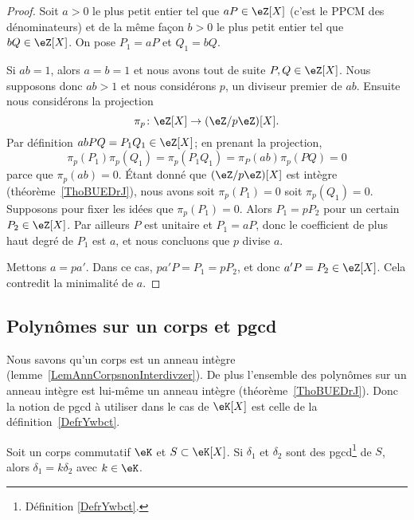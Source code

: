 \begin{proof}
	Soit \( a>0\) le plus petit entier tel que \( aP\in\eZ[X]\) (c'est le PPCM des dénominateurs) et de la même façon \( b>0\) le plus petit entier tel que \( bQ\in \eZ[X]\). On pose \( P_1=aP\) et \( Q_1=bQ\).

	Si \( ab=1\), alors \( a=b=1\) et nous avons tout de suite \( P,Q\in \eZ[X]\). Nous supposons donc \( ab>1\) et nous considérons \( p\), un diviseur premier de \( ab\). Ensuite nous considérons la projection
	\begin{equation}
		\pi_p\colon \eZ[X]\to (\eZ/p\eZ)[X].
	\end{equation}
	Par définition \( abPQ=P_1Q_1\in \eZ[X]\); en prenant la projection,
	\begin{equation}
		\pi_p(P_1)\pi_p(Q_1)=\pi_p(P_1Q_1)=\pi_P(ab)\pi_p(PQ)=0
	\end{equation}
	parce que \( \pi_p(ab)=0\). Étant donné que \( (\eZ/p\eZ)[X]\) est intègre (théorème~\ref{ThoBUEDrJ}), nous avons soit \( \pi_p(P_1)=0\) soit \( \pi_p(Q_1)=0\). Supposons pour fixer les idées que \( \pi_p(P_1)=0\). Alors \( P_1=pP_2\) pour un certain \( P_2\in \eZ[X]\). Par ailleurs \( P\) est unitaire et \( P_1=aP\), donc le coefficient de plus haut degré de \( P_1\) est \( a\), et nous concluons que \( p\) divise \( a\).

	Mettons \( a=pa'\). Dans ce cas, \( pa'P=P_1=pP_2\), et donc \( a'P=P_2\in \eZ[X]\). Cela contredit la minimalité de \( a\).
\end{proof}

\subsection{Polynômes sur un corps et pgcd}

Nous savons qu'un corps est un anneau intègre (lemme~\ref{LemAnnCorpsnonInterdivzer}). De plus l'ensemble des polynômes sur un anneau intègre est lui-même un anneau intègre (théorème~\ref{ThoBUEDrJ}). Donc la notion de pgcd à utiliser dans le cas de \( \eK[X]\) est celle de la définition~\ref{DefrYwbct}.

\begin{lemma}      \label{LEMooXISOooNAMeVX}
	Soit un corps commutatif \( \eK\) et \( S\subset \eK[X]\). Si \( \delta_1\) et \( \delta_2\) sont des pgcd\footnote{Définition \ref{DefrYwbct}.} de \( S\), alors \( \delta_1=k\delta_2\) avec \( k\in \eK\).
\end{lemma}

